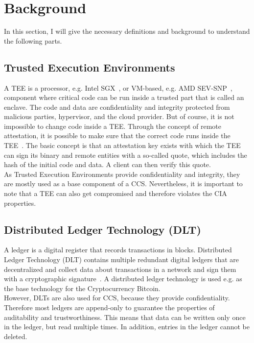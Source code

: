 \section{Background}
In this section, I will give the necessary definitions and background to understand the following parts. 
\subsection{Trusted Execution Environments}
A TEE is a processor, e.g. Intel SGX~\cite{sgx}, or VM-based, e.g. AMD SEV-SNP~\cite{amd}, component where critical code can be run inside a trusted part that is called an enclave. The code and data are confidentiality and integrity protected from malicious parties, hypervisor, and the cloud provider.  But of course, it is not impossible to change code inside a TEE. Through the concept of remote attestation, it is possible to make sure that the correct code runs inside the TEE~\cite{remoteAttestation}.  The basic concept is that an attestation key exists with which the TEE can sign its binary and remote entities with a so-called quote, which includes the hash of the initial code and data. A client can then verify this quote. \\ %
As Trusted Execution Environments provide confidentiality and integrity, they are mostly used as a base component of a CCS. Nevertheless, it is important to note that a TEE can also get compromised and therefore violates the CIA properties.
\subsection{Distributed Ledger Technology (DLT)}
A ledger is a digital register that records transactions in blocks. Distributed Ledger Technology (DLT) contains multiple redundant digital ledgers that are decentralized and collect data about transactions in a network and sign them with a cryptographic signature~\cite{ledger}. A distributed ledger technology is used e.g. as the base technology for the Cryptocurrency Bitcoin.\\
 However, DLTs are also used for CCS, because they provide confidentiality. Therefore most ledgers are append-only to guarantee the properties of auditability and trustworthiness. This means that data can be written only once in the ledger, but read multiple times. In addition, entries in the ledger cannot be deleted. 
